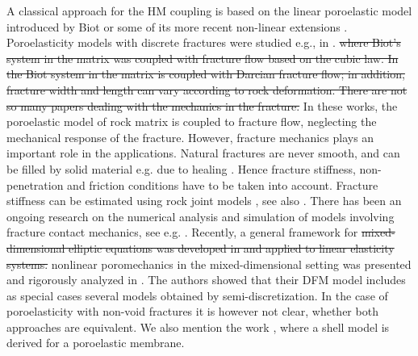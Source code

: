 \documentclass[a4paper]{article}
\numberwithin{equation}{section}
\def\js#1{{\color{blue}#1}}
\begin{document}
A classical approach for the HM coupling is based on the linear poroelastic model introduced by Biot \cite{biot1941general} or some of its more recent non-linear extensions \cite{rutqvist2003role,Jing2007Fluid}. 
Poroelasticity models with discrete fractures were studied e.g., in \cite{ganis2014modeling,girault_lubrication,girault2019mixed,bukac2017dimensional,hanowski2018hydromechanical}.
\js{\sout{ where Biot's system in the matrix was coupled with fracture flow based on the cubic law.
In %
the Biot system in the matrix is coupled with Darcian fracture flow; in addition, fracture width and length can vary according to rock deformation.
There are not so many papers dealing with the mechanics in the fracture.}
In these works, the poroelastic model of rock matrix is coupled to fracture flow, neglecting the mechanical response of the fracture.
However, fracture mechanics plays an important role in the applications. Natural fractures are never smooth, and can be filled by solid material e.g. due to healing \cite{vass}. Hence fracture stiffness, non-penetration and friction conditions have to be taken into account.
Fracture stiffness can be estimated using rock joint models \cite{bandis1983fundamentals}, see also \cite{rutqvist2003role}.
There has been an ongoing research on the numerical analysis and simulation of models involving fracture contact mechanics, see e.g. \cite{garipov2016discrete,franceschini2020algebraically,berge2019finite,blaheta2020bayesian,bonaldi2022numerical}.}
\js{Recently,} a general framework for \js{\sout{mixed-dimensional elliptic equations was developed in
and applied to linear elasticity systems.}
nonlinear poromechanics in the mixed-dimensional setting was presented and rigorously analyzed in \cite{boon_poro}.
The authors showed that their DFM model includes as special cases several models obtained by semi-discretization.
In the case of poroelasticity with non-void fractures it is however not clear, whether both approaches are equivalent.}
We also mention the work \cite{mikelic2019derivation}, where a shell model is derived for a poroelastic membrane.
\end{document}
